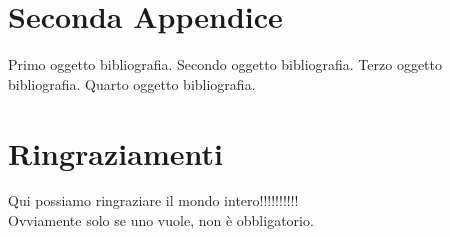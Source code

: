 \documentclass[12pt,a4paper,openright,twoside]{report}
\begin{document}
    \chapter{Seconda Appendice}             %
    \begin{thebibliography}{90}             %
        \rhead[\fancyplain{}{\bfseries \leftmark}]{\fancyplain{}{\bfseries
        \thepage}}
         Primo oggetto bibliografia.
         Secondo oggetto bibliografia.
         Terzo oggetto bibliografia.
         Quarto oggetto bibliografia.
    \end{thebibliography}
    \clearpage{\pagestyle{empty}\cleardoublepage}
    \chapter*{Ringraziamenti}
    \thispagestyle{empty}
    Qui possiamo ringraziare il mondo intero!!!!!!!!!!\\
    Ovviamente solo se uno vuole, non \`e obbligatorio.
\end{document}

